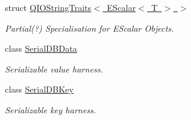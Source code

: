 \begin{DoxyCompactItemize}
struct \mbox{\hyperlink{structADATIO_1_1QIOStringTraits_3_01EScalar_3_01T_01_4_01_4}{Q\+I\+O\+String\+Traits$<$ E\+Scalar$<$ T $>$ $>$}}
\begin{DoxyCompactList}\small\item\em Partial(?) Specialisation for E\+Scalar Objects. \end{DoxyCompactList}\item 
class \mbox{\hyperlink{classADATIO_1_1SerialDBData}{Serial\+D\+B\+Data}}
\begin{DoxyCompactList}\small\item\em Serializable value harness. \end{DoxyCompactList}\item 
class \mbox{\hyperlink{classADATIO_1_1SerialDBKey}{Serial\+D\+B\+Key}}
\begin{DoxyCompactList}\small\item\em Serializable key harness. \end{DoxyCompactList}\end{DoxyCompactItemize}
